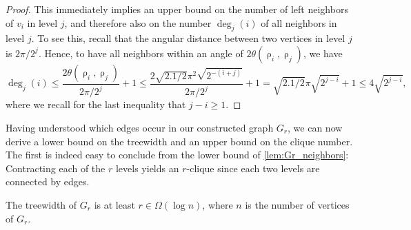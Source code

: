 \documentclass[a4paper,english,cleveref,thm-restate]{lipics-v2021}
\DeclareMathOperator{\rad}{\rho}
\begin{document}
\begin{proof}
    
    This immediately implies an upper bound on the number of left neighbors of $ v_i $ in level $ j $, and therefore also on the number $ \deg_j(i) $ of all neighbors in level $ j $.
    To see this, recall that the angular distance between two vertices in level $ j $ is $ 2 \pi / 2^j $.
    Hence, to have all neighbors within an angle of $ 2 \theta(\rad_i,\rad_j) $, we have
    \begin{equation*}
        \deg_j(i) 
        \leq \frac{2 \theta(\rad_i,\rad_j)}{2 \pi / 2^j} + 1
        \leq \frac{2 \sqrt{2.1/2} \pi^2 \sqrt{2^{-(i+j)}}}{2\pi/2^j} + 1
        = \sqrt{2.1/2} \pi \sqrt{2^{j-i}} + 1
        \leq 4 \sqrt{2^{j-i}},
    \end{equation*}
    where we recall for the last inequality that $ j - i \geq 1 $.
\end{proof}

Having understood which edges occur in our constructed graph $ G_r $, we can now derive a lower bound on the treewidth and an upper bound on the clique number.
The first is indeed easy to conclude from the lower bound of \cref{lem:Gr_neighbors}: 
Contracting each of the $ r $ levels yields an $ r $-clique since each two levels are connected by edges.

\begin{corollary}\label{cor:Gr_tw_logn}
    The treewidth of $ G_r $ is at least $ r \in \Omega(\log n) $, where $ n $ is the number of vertices of $ G_r $.
\end{corollary}
%
%
%

\end{document}
